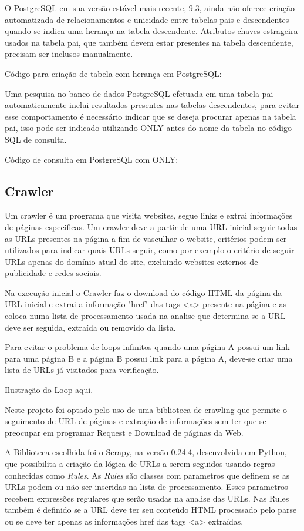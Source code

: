 \documentclass[12pt]{article}
\begin{document}
O PostgreSQL em sua versão estável mais recente, 9.3, ainda não oferece criação automatizada de relacionamentos e unicidade entre tabelas pais e descendentes quando se indica uma herança na tabela descendente. Atributos chaves-estrageira usados na tabela pai, que também devem estar presentes na tabela descendente, precisam ser inclusos manualmente.

Código para criação de tabela com herança em PostgreSQL:


Uma pesquisa no banco de dados PostgreSQL efetuada em uma tabela pai automaticamente inclui resultados presentes nas tabelas descendentes, para evitar esse comportamento é necessário indicar que se deseja procurar apenas na tabela pai, isso pode ser indicado utilizando ONLY antes do nome da tabela no código SQL de consulta.

Código de consulta em PostgreSQL com ONLY:





\subsection{Crawler}

Um crawler é um programa que visita websites, segue links e extrai informações de páginas especificas. Um crawler deve a partir de uma URL inicial seguir todas as URLs presentes na página a fim de vasculhar o website, critérios podem ser utilizados para indicar quais URLs seguir, como por exemplo o critério de seguir URLs apenas do domínio atual do site, excluindo websites externos de publicidade e redes sociais.

Na execução inicial o Crawler faz o download do código HTML da página da URL inicial e extrai a informação "href" das tags <a> presente na página e as coloca numa lista de processamento usada na analise que determina se a URL deve ser seguida, extraída ou removido da lista. 

Para evitar o problema de loops infinitos quando uma página A possui um link para uma página B e a página B possui link para a página A, deve-se criar uma lista de URLs já visitados para verificação.  
 
Ilustração do Loop aqui. 

Neste projeto foi optado pelo uso de uma biblioteca de crawling que permite o seguimento de URL de páginas e extração de informações sem ter que se preocupar em programar Request e Download de páginas da Web.

A Biblioteca escolhida foi o Scrapy, na versão 0.24.4, desenvolvida em Python, que possibilita a criação da lógica de URLs a serem seguidos usando regras conhecidas como \textit{Rules}. As \textit{Rules} são classes com parametros que definem se as URLs podem ou não ser inseridas na lista de processamento. Esses parametros recebem expressões regulares que serão usadas na analise das URLs. Nas Rules também é definido se a URL deve ter seu conteúdo HTML processado pelo parse ou se deve ter apenas as informações href das tags <a> extraídas.
\end{document}
